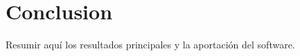 \section{Conclusion}
\label{sec:conclusion}

Resumir aquí los resultados principales y la aportación del software.
